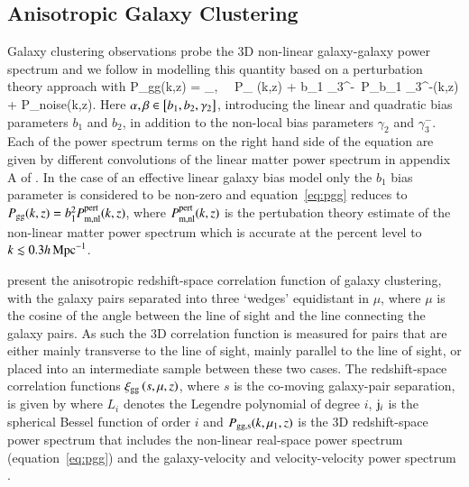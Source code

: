 \subsection{Anisotropic Galaxy Clustering}
\label{sec:clustering}
Galaxy clustering observations probe the 3D non-linear galaxy-galaxy power spectrum and we follow \citet{sanchez/etal:2017} in modelling this quantity based on a perturbation theory approach with
\be
\label{eq:pgg}
P_{\rm gg}(k,z) = \sum_{\alpha,\beta} \alpha\, \beta\, P_{\alpha
  \beta}(k,z) + b_1 \gamma_3^-\, P_{b_1 \gamma_3^-}(k,z) + P_{\rm noise}(k,z)\;.
\ee
Here $\alpha,\beta \in \left[ b_1, b_2, \gamma_2 \right]$, introducing the linear and quadratic bias parameters $b_1$ and $b_2$, in addition to the non-local bias parameters $ \gamma_2$ and $\gamma_3^-$.  Each of the power spectrum terms on the right hand side of the equation are given by different convolutions of the linear matter power spectrum in appendix A of \citet{sanchez/etal:2017}.   In the case of an effective linear galaxy bias model \citep[see for example][]{vanuitert/etal:2018, abbott/etal:2018} only the $b_1$ bias parameter is considered to be non-zero and equation~\ref{eq:pgg} reduces to $P_{\rm gg}(k,z) =b_1^2 P_{\rm m, nl}^{\rm pert}(k,z)$, where $P_{\rm m, nl}^{\rm pert}(k,z)$ is the pertubation theory estimate of the non-linear matter power spectrum which is accurate at the percent level to $k \lesssim 0.3 h \,{\rm Mpc}^{-1}$.

\citet{sanchez/etal:2017} present the anisotropic redshift-space correlation function of galaxy clustering, with the galaxy pairs separated into three `wedges' equidistant in $\mu$, where $\mu$ is the cosine of the angle between the line of sight and the line connecting the galaxy pairs.   As such the 3D correlation function is measured for pairs that are either mainly transverse to the line of sight, mainly parallel to the line of sight, or placed into an intermediate sample between these two cases.  The redshift-space correlation functions $\xi_{\rm gg} \left( s,\mu,z \right)$, where $s$ is the co-moving galaxy-pair separation, is given by
where $L_i$ denotes the Legendre polynomial of degree $i$, ${\rm j}_i$ is the spherical Bessel function of order $i$ and $P_{\rm gg, s}(k,\mu_1,z)$ is the 3D redshift-space power spectrum that includes the non-linear real-space power spectrum (equation~\ref{eq:pgg}) and the galaxy-velocity and velocity-velocity power spectrum \citep[see][for details]{sanchez/etal:2017}.   

